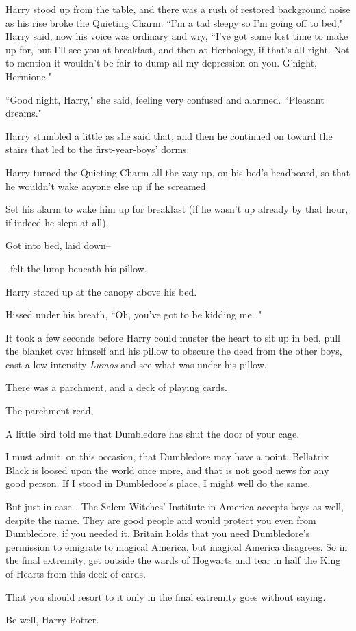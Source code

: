 Harry stood up from the table, and there was a rush of restored background noise as his rise broke the Quieting Charm. ``I'm a tad sleepy so I'm going off to bed," Harry said, now his voice was ordinary and wry, ``I've got some lost time to make up for, but I'll see you at breakfast, and then at Herbology, if that's all right. Not to mention it wouldn't be fair to dump all my depression on you. G'night, Hermione."

``Good night, Harry," she said, feeling very confused and alarmed. ``Pleasant dreams."

Harry stumbled a little as she said that, and then he continued on toward the stairs that led to the first-year-boys' dorms.

\later

Harry turned the Quieting Charm all the way up, on his bed's headboard, so that he wouldn't wake anyone else up if he screamed.

Set his alarm to wake him up for breakfast (if he wasn't up already by that hour, if indeed he slept at all).

Got into bed, laid down\---

\---felt the lump beneath his pillow.

Harry stared up at the canopy above his bed.

Hissed under his breath, ``Oh, you've got to be kidding me{\ldots}"

It took a few seconds before Harry could muster the heart to sit up in bed, pull the blanket over himself and his pillow to obscure the deed from the other boys, cast a low-intensity \emph{Lumos} and see what was under his pillow.

There was a parchment, and a deck of playing cards.

The parchment read,

\begin{writtenNote}
A little bird told me that Dumbledore has shut the door of your cage.

I must admit, on this occasion, that Dumbledore may have a point. Bellatrix Black is loosed upon the world once more, and that is not good news for any good person. If I stood in Dumbledore's place, I might well do the same.

But just in case{\ldots} The Salem Witches' Institute in America accepts boys as well, despite the name. They are good people and would protect you even from Dumbledore, if you needed it. Britain holds that you need Dumbledore's permission to emigrate to magical America, but magical America disagrees. So in the final extremity, get outside the wards of Hogwarts and tear in half the King of Hearts from this deck of cards.

That you should resort to it only in the final extremity goes without saying.

Be well, Harry Potter.

\end{writtenNote}

